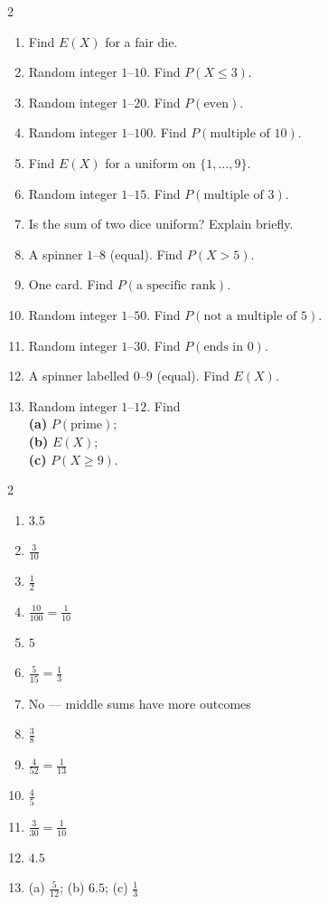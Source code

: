 \documentclass[11pt]{article}
\begin{document}
\clearpage
{}

\begin{recapbox}
\begin{multicols}{2}
\small
\begin{enumerate}[leftmargin=*,itemsep=3pt]
  \item Find $E(X)$ for a fair die.
  \item Random integer $1$--$10$. Find $P(X\le3)$.
  \item Random integer $1$--$20$. Find $P(\text{even})$.
  \item Random integer $1$--$100$. Find $P(\text{multiple of }10)$.
  \item Find $E(X)$ for a uniform on $\{1,\dots,9\}$.
  \item Random integer $1$--$15$. Find $P(\text{multiple of }3)$.
  \item Is the sum of two dice uniform? Explain briefly.
  \item A spinner $1$--$8$ (equal). Find $P(X>5)$.
  \item One card. Find $P(\text{a specific rank})$.
  \item Random integer $1$--$50$. Find $P(\text{not a multiple of }5)$.
  \item Random integer $1$--$30$. Find $P(\text{ends in }0)$.
  \item A spinner labelled $0$--$9$ (equal). Find $E(X)$.
  \item Random integer $1$--$12$. Find \\ \textbf{(a)} $P(\text{prime})$; \\ \textbf{(b)} $E(X)$; \\ \textbf{(c)} $P(X\ge9)$.
\end{enumerate}
\end{multicols}
\end{recapbox}

\begin{keybox}
\begin{multicols}{2}
\small
\begin{enumerate}[leftmargin=*,itemsep=3pt]
  \item $3.5$
  \item $\tfrac{3}{10}$
  \item $\tfrac12$
  \item $\tfrac{10}{100}=\tfrac{1}{10}$
  \item $5$
  \item $\tfrac{5}{15}=\tfrac13$
  \item No --- middle sums have more outcomes
  \item $\tfrac38$
  \item $\tfrac{4}{52}=\tfrac{1}{13}$
  \item $\tfrac45$
  \item $\tfrac{3}{30}=\tfrac{1}{10}$
  \item $4.5$
  \item (a) $\tfrac{5}{12}$; (b) $6.5$; (c) $\tfrac13$
\end{enumerate}
\end{multicols}
\end{keybox}
\end{document}

